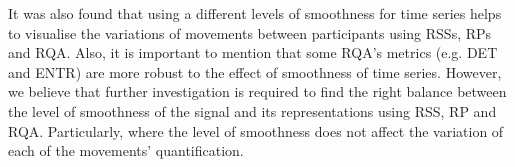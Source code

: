 
It was also found that using a different levels of smoothness
for time series helps to visualise the variations of movements 
between participants using RSSs, RPs and RQA. Also, it is important to mention 
that some RQA's metrics (e.g. DET and  ENTR) are more robust 
to the effect of smoothness of time series.
However, we believe that further investigation is required to find the 
right balance between the level of smoothness of the signal
and its representations using RSS, RP and RQA.
Particularly, where the level of smoothness does not affect 
the variation of each of the movements' quantification.
%
% 

